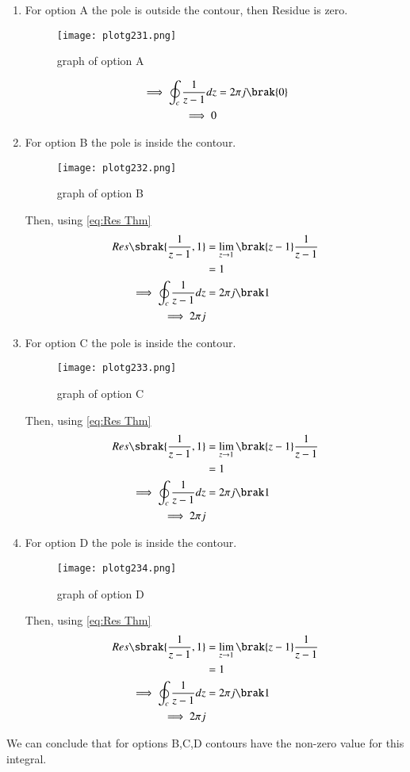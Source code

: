 \documentclass[journal,12pt,twocolumn]{IEEEtran}
\theoremstyle{remark}
\begin{document}
\begin{enumerate}
\item For option A the pole is outside the contour, then Residue is zero.\\
\begin{figure}[h!]
    \centering
    \texttt{[image: plotg231.png]}
    \caption{graph of option A}
\end{figure}
\begin{align}
\implies\oint_{c}\frac{1}{z-1}dz &=2\pi j\brak{0}\\
\implies 0
\end{align}
\item For option B the pole is inside the contour.\\
\begin{figure}[h!]
    \centering
    \texttt{[image: plotg232.png]}
    \caption{graph of option B}
\end{figure}
Then, using \eqref{eq:Res Thm}
\begin{align}
Res\sbrak{\frac{1}{z-1},1} &=\lim_{z\to 1}\brak{z-1}\frac{1}{z-1}\\
&=1\\
\implies \oint_{c}\frac{1}{z-1}dz&=2\pi j\brak 1\\
\implies 2\pi j
\end{align}
\item For option C the pole is inside the contour.\\
\begin{figure}[h!]
    \centering
    \texttt{[image: plotg233.png]}
    \caption{graph of option C}
\end{figure}
Then, using \eqref{eq:Res Thm}
\begin{align}
Res\sbrak{\frac{1}{z-1},1} &=\lim_{z\to 1}\brak{z-1}\frac{1}{z-1}\\
&=1\\
\implies \oint_{c}\frac{1}{z-1}dz&=2\pi j\brak 1\\
\implies 2\pi j
\end{align}
\item For option D the pole is inside the contour.\\
\begin{figure}[h!]
    \centering
    \texttt{[image: plotg234.png]}
    \caption{graph of option D}
\end{figure}
Then, using \eqref{eq:Res Thm}
\begin{align}
Res\sbrak{\frac{1}{z-1},1} &=\lim_{z\to 1}\brak{z-1}\frac{1}{z-1}\\
&=1\\
\implies \oint_{c}\frac{1}{z-1}dz&=2\pi j\brak 1\\
\implies 2\pi j
\end{align}
\end{enumerate}
We can conclude that for options B,C,D contours have the non-zero value for this integral.
\end{document}
